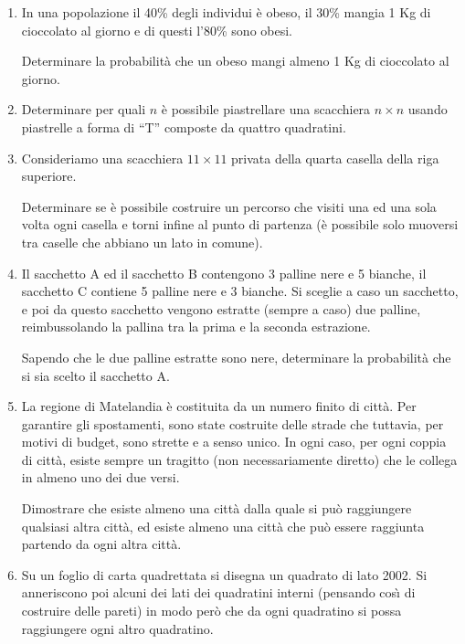 \documentclass[a4paper,10pt]{article}
\begin{document}
\begin{enumerate}
	\item  In una popolazione il 40\% degli individui \`{e} obeso, il
	30\% mangia 1 Kg di cioccolato al giorno e di questi l'80\% sono obesi.

	Determinare la probabilit\`{a} che un obeso mangi almeno 1 Kg di
	cioccolato al giorno.

	\item  Determinare per quali $n$ \`{e} possibile piastrellare una
	scacchiera $n\times n$ usando piastrelle a forma di ``T'' composte
	da quattro quadratini.

	\item  Consideriamo una scacchiera $11\times 11$ privata della
	quarta casella della riga superiore.

	Determinare se \`{e} possibile costruire un percorso che visiti una
	ed una sola volta ogni casella e torni infine al punto di partenza
	(\`{e} possibile solo muoversi tra caselle che abbiano un lato in
	comune).

	\item  Il sacchetto A ed il sacchetto B contengono 3 palline nere e
	5 bianche, il sacchetto C contiene 5 palline nere e 3 bianche. Si
	sceglie a caso un sacchetto, e poi da questo sacchetto vengono
	estratte (sempre a caso) due palline, reimbussolando la pallina tra
	la prima e la seconda estrazione.

	Sapendo che le due palline estratte sono nere, determinare la
	probabilit\`{a} che si sia scelto il sacchetto A.

	\item  La regione di Matelandia \`{e} costituita da un numero finito
	di citt\`{a}. Per garantire gli spostamenti, sono state costruite
	delle strade che tuttavia, per motivi di budget, sono strette e a
	senso unico. In ogni caso, per ogni coppia di citt\`{a}, esiste
	sempre un tragitto (non necessariamente diretto) che le collega in
	almeno uno dei due versi.

	Dimostrare che esiste almeno una citt\`{a} dalla quale si pu\`{o}
	raggiungere qualsiasi altra citt\`{a}, ed esiste almeno una citt\`{a}
	che pu\`{o} essere raggiunta partendo da ogni altra citt\`{a}.

	\item  Su un foglio di carta quadrettata si disegna un quadrato di
	lato 2002.  Si anneriscono poi alcuni dei lati dei quadratini
	interni (pensando cos\`{\i} di costruire delle pareti) in modo
	per\`{o} che da ogni quadratino si possa raggiungere ogni altro
	quadratino.


\end{enumerate}
\end{document}
